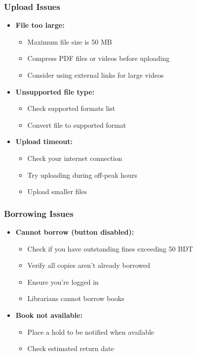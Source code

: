 \documentclass[12pt,a4paper]{article}
\begin{document}
\subsubsection{Upload Issues}
\begin{itemize}[leftmargin=*]
    \item \textbf{File too large:}
        \begin{itemize}
            \item Maximum file size is 50 MB
            \item Compress PDF files or videos before uploading
            \item Consider using external links for large videos
        \end{itemize}
    \item \textbf{Unsupported file type:}
        \begin{itemize}
            \item Check supported formats list
            \item Convert file to supported format
        \end{itemize}
    \item \textbf{Upload timeout:}
        \begin{itemize}
            \item Check your internet connection
            \item Try uploading during off-peak hours
            \item Upload smaller files
        \end{itemize}
\end{itemize}

\subsubsection{Borrowing Issues}
\begin{itemize}[leftmargin=*]
    \item \textbf{Cannot borrow (button disabled):}
        \begin{itemize}
            \item Check if you have outstanding fines exceeding 50 BDT
            \item Verify all copies aren't already borrowed
            \item Ensure you're logged in
            \item Librarians cannot borrow books
        \end{itemize}
    \item \textbf{Book not available:}
        \begin{itemize}
            \item Place a hold to be notified when available
            \item Check estimated return date
        \end{itemize}
\end{itemize}
\end{document}
